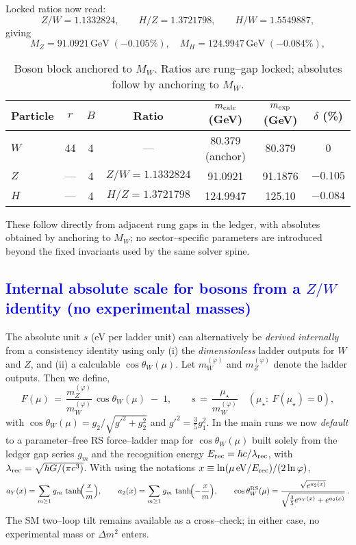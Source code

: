 \documentclass[%
 amsmath,amssymb,
 aps,
prb,
floatfix, showkeys
]{revtex4-2}
\newcommand{\modif}[1]{\textcolor{blue}{#1}}
\begin{document}
Locked ratios now read:
\[
Z/W=1.1332824,\qquad H/Z=1.3721798,\qquad H/W=1.5549887,
\]
giving
\[
M_Z=91.0921\,\text{GeV}\;(-0.105\%),\quad
M_H=124.9947\,\text{GeV}\;(-0.084\%),
\]
\begin{table}[H]
\caption{Boson block anchored to $M_W$. Ratios are rung--gap locked; absolutes follow by anchoring to $M_W$.}
\label{tab:bosons}
\begin{tabular}{l c c c c c c}
\hline
Particle & $r$ & $B$ & Ratio & $m_{\rm calc}$ (GeV) & $m_{\rm exp}$ (GeV) & $\delta$ (\%) \\
\hline
$W$ & 44  & 4 & ---                 & 80.379 (anchor) & 80.379   & 0 \\
$Z$ & --- & 4 & $Z/W=1.1332824$    & 91.0921         & 91.1876  & $-0.105$ \\
$H$ & --- & 4 & $H/Z=1.3721798$    & 124.9947        & 125.10   & $-0.084$ \\
\hline
\end{tabular}
\end{table}
These follow directly from adjacent rung gaps in the ledger, with absolutes obtained by anchoring to $M_W$; no sector--specific parameters are introduced beyond the fixed invariants used by the same solver spine.








{\modif{
\subsection{Internal absolute scale for bosons from a $Z/W$ identity (no experimental masses)}
\label{subsec:ZW-anchor}
}}
The absolute unit $s$ (eV per ladder unit) can alternatively be \emph{derived internally} from a consistency identity using only (i) the \emph{dimensionless} ladder outputs for $W$ and $Z$, and (ii) a calculable $\cos\theta_W(\mu)$.
Let $m_W^{(\varphi)}$ and $m_Z^{(\varphi)}$ denote the ladder outputs. Then we define,
\begin{equation}
  F(\mu) \,=\, \frac{m_Z^{(\varphi)}}{m_W^{(\varphi)}}\,\cos\theta_W(\mu)\; -\; 1,\qquad
  s \,=\, \frac{\mu_\star}{m_W^{(\varphi)}}\quad(\mu_\star:\ F(\mu_\star)=0),
\end{equation}
with $\cos\theta_W(\mu)=g_2/\sqrt{g'^2+g_2^2}$ and $g'^2=\tfrac{3}{5}g_1^2$.
In the main runs we now \emph{default} to a parameter--free RS force--ladder map for $\cos\theta_W(\mu)$ built solely from the ledger gap series $g_m$ and the recognition energy $E_{\rm rec}=\hbar c/\lambda_{\rm rec}$, with $\lambda_{\rm rec}=\sqrt{\hbar G/(\pi c^3)}$. With using the notations
$x\equiv \ln(\mu\,\mathrm{eV}/E_{\rm rec})/(2\ln\varphi)$,
\[
  a_Y(x)=\sum_{m\ge1} g_m\,\tanh\!\Bigl(\frac{x}{m}\Bigr),\qquad
  a_2(x)=\sum_{m\ge1} g_m\,\tanh\!\Bigl(-\frac{x}{m}\Bigr),\qquad
  \cos\theta_W^{\rm RS}(\mu)=\frac{\sqrt{e^{a_2(x)}}}{\sqrt{\tfrac{3}{5}e^{a_Y(x)}+e^{a_2(x)}}}\,.
\]
The SM two--loop tilt remains available as a cross--check; in either case, no experimental mass or $\Delta m^2$ enters.
\end{document}
